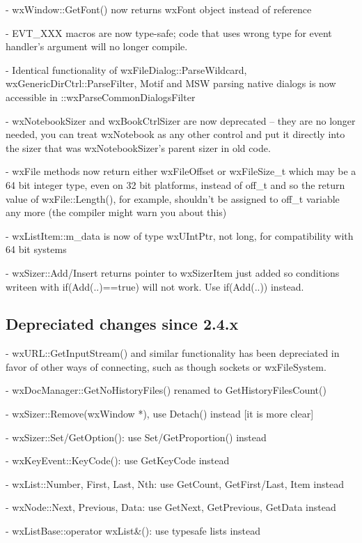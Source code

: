 - wxWindow::GetFont() now returns wxFont object instead of reference

- EVT\_XXX macros are now type-safe; code that uses wrong type for event
  handler's argument will no longer compile.

- Identical functionality of wxFileDialog::ParseWildcard,
  wxGenericDirCtrl::ParseFilter, Motif and MSW parsing native dialogs
  is now accessible in ::wxParseCommonDialogsFilter

- wxNotebookSizer and wxBookCtrlSizer are now deprecated -- they are no longer
  needed, you can treat wxNotebook as any other control and put it directly
  into the sizer that was wxNotebookSizer's parent sizer in old code.

- wxFile methods now return either wxFileOffset or wxFileSize\_t which may be a
  64 bit integer type, even on 32 bit platforms, instead of off\_t and so the
  return value of wxFile::Length(), for example, shouldn't be assigned to off\_t
  variable any more (the compiler might warn you about this)

- wxListItem::m\_data is now of type wxUIntPtr, not long, for compatibility
  with 64 bit systems

- wxSizer::Add/Insert returns pointer to wxSizerItem just added so conditions
  writeen with if(Add(..)==true) will not work. Use if(Add(..)) instead.

\subsection{Depreciated changes since 2.4.x}

- wxURL::GetInputStream() and similar functionality has been depreciated in 
  favor of other ways of connecting, such as though sockets or wxFileSystem.

- wxDocManager::GetNoHistoryFiles() renamed to GetHistoryFilesCount()

- wxSizer::Remove(wxWindow *), use Detach() instead [it is more clear]

- wxSizer::Set/GetOption(): use Set/GetProportion() instead

- wxKeyEvent::KeyCode(): use GetKeyCode instead

- wxList::Number, First, Last, Nth: use GetCount, GetFirst/Last, Item instead

- wxNode::Next, Previous, Data: use GetNext, GetPrevious, GetData instead

- wxListBase::operator wxList&(): use typesafe lists instead

